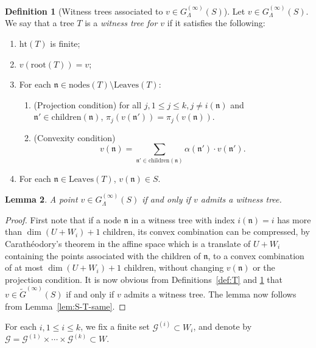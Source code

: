 \documentclass[10pt]{amsart}
\theoremstyle{plain}
\newtheorem{lemma}{Lemma}[section]
\theoremstyle{definition}
\newtheorem{definition}[lemma]{Definition}
\providecommand{\cG}[0]{\ensuremath{\mathcal G}\xspace}
\let\leq\leqslant
\newcommand{\fn}{\mathfrak{n}}
\begin{document}
\begin{definition}[Witness trees associated to $v \in G^{(\infty)}_\Lambda(S)$]
\label{def:witness-tree}
    Let $v \in G^{(\infty)}_\Lambda(S)$. We say that a tree $T$  is a \emph{witness tree for $v$}  if it satisfies the following:
    \begin{enumerate}[1.]
        \item $\mathrm{ht}(T)$ is finite;
        \item $v(\mathrm{root}(T)) = v$;
        \item For each $\mathfrak{n} \in \mathrm{nodes}(T) \setminus \mathrm{Leaves}(T)$:
        \begin{enumerate}
         \item (Projection condition) for all $j, 1\leq j \leq k, j \neq i(\mathfrak{n})$ and $\mathfrak{n}' \in \mathrm{children}(\mathfrak{n})$, $\pi_j(v(\mathfrak{n}')) = \pi_j(v(\mathfrak{n}))$.
        \item (Convexity condition)
            \[
            v(\mathfrak{n}) = \sum_{\mathfrak{n}' \in \mathrm{children}(\mathfrak{n})} \alpha(\mathfrak{n}')\cdot v(\mathfrak{n}').
            \]
        \end{enumerate}
        \item For each $\mathfrak{n} \in \mathrm{Leaves}(T)$, $v(\mathfrak{n}) \in S$.
    \end{enumerate}
\end{definition}

\begin{lemma}
\label{lem:every-point-has-a-witness-tree}
A point $v \in G^{(\infty)}_\Lambda(S)$ if and only if $v$ admits a witness tree.
\end{lemma}

\begin{proof}
First note that if a node $\fn$  in a witness tree with index $i(\fn) = i$ has more than \(\dim(U+W_i)+1\) children, its convex combination
can be compressed, by Carath\'eodory's theorem in the affine space which is a translate of \(U+W_i\) containing the points associated with the children of $\fn$,
to a convex combination of at most \(\dim(U+W_i)+1\) children, without
changing $v(\fn)$ or the projection condition.
 It is now obvious from Definitions~\ref{def:T} and \ref{def:witness-tree} that
 $v \in \widetilde{G}^{(\infty)}(S)$ if and only if $v$ admits a witness tree.
 The lemma now follows from Lemma~\ref{lem:S-T-same}.
\end{proof}

For each $i, 1 \leq i \leq k$, we fix a finite set 
$\cG^{(i)} \subset W_i$,
and denote by $\cG = \cG^{(1)} \times \cdots \times \cG^{(k)} \subset W$.
\end{document}
